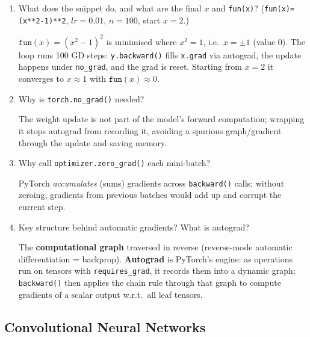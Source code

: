 \documentclass[10pt,a4paper]{article}
\newcommand{\q}[1]{\item #1}
\begin{document}
\begin{enumerate}[leftmargin=*,label=\textbf{Q\arabic*.}]

\q What does the snippet do, and what are the final $x$ and \texttt{fun(x)}? (\texttt{fun(x)=(x**2-1)**2}, $lr=0.01$, $n=100$, start $x=2$.)
\begin{answerbox}
$\texttt{fun}(x)=(x^2-1)^2$ is minimised where $x^2=1$, i.e.\ $x=\pm1$ (value $0$). The loop runs 100 GD steps: \texttt{y.backward()} fills \texttt{x.grad} via autograd, the update happens under \texttt{no\_grad}, and the grad is reset. Starting from $x=2$ it converges to $x\approx1$ with $\texttt{fun}(x)\approx0$.
\end{answerbox}

\q Why is \texttt{torch.no\_grad()} needed?
\begin{answerbox}
The weight update is not part of the model's forward computation; wrapping it stops autograd from recording it, avoiding a spurious graph/gradient through the update and saving memory.
\end{answerbox}

\q Why call \texttt{optimizer.zero\_grad()} each mini-batch?
\begin{answerbox}
PyTorch \emph{accumulates} (sums) gradients across \texttt{backward()} calls; without zeroing, gradients from previous batches would add up and corrupt the current step.
\end{answerbox}

\q Key structure behind automatic gradients? What is autograd?
\begin{answerbox}
The \textbf{computational graph} traversed in reverse (reverse-mode automatic differentiation = backprop). \textbf{Autograd} is PyTorch's engine: as operations run on tensors with \texttt{requires\_grad}, it records them into a dynamic graph; \texttt{backward()} then applies the chain rule through that graph to compute gradients of a scalar output w.r.t.\ all leaf tensors.
\end{answerbox}

\end{enumerate}

\subsection{Convolutional Neural Networks}
\end{document}
